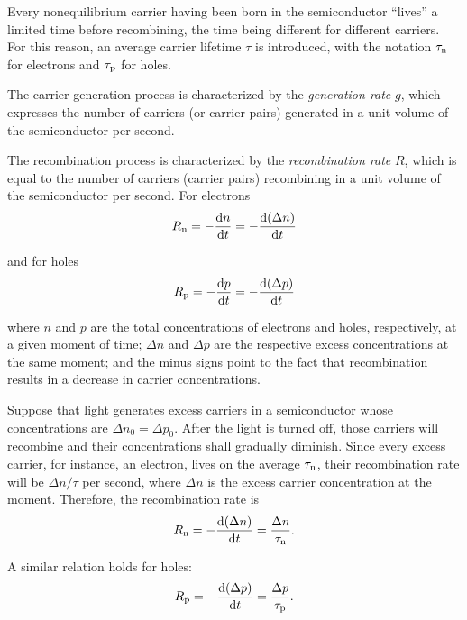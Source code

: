 Every nonequilibrium carrier having been born in the semiconductor ``lives'' a limited time before recombining, the time being different for different carriers. For this reason, an average carrier lifetime $\tau$ is introduced, with the notation $\tau_{\text{n}}$ for electrons and $\tau_{\text{p}}$ for holes.

The carrier generation process is characterized by the \textit{generation rate} $g$, which expresses the number of carriers (or carrier pairs) generated in a unit volume of the semiconductor per second.

The recombination process is characterized by the \textit{recombination rate} $R$, which is equal to the number of carriers (carrier pairs) recombining in a unit volume of the semiconductor per second. For electrons
\begin{equation}\label{eq:5_46}
    R_{\text{n}} = -\dfrac{\mathrm{d} n}{\mathrm{d} t} = - \dfrac{\mathrm{d}(\Delta{n})}{\mathrm{d} t}
\end{equation}

\noindent
and for holes
\begin{equation}\label{eq:5_47}
    R_{\text{p}} = -\dfrac{\mathrm{d} p}{\mathrm{d} t} = - \dfrac{\mathrm{d}(\Delta{p})}{\mathrm{d} t}
\end{equation}

\noindent
where $n$ and $p$ are the total concentrations of electrons and holes, respectively, at a given moment of time; $\Delta{n}$ and $\Delta{p}$ are the respective
excess concentrations at the same moment; and the minus signs point to the fact that recombination results in a decrease in carrier concentrations.

Suppose that light generates excess carriers in a semiconductor whose concentrations are $\Delta{n}_0=\Delta{p}_0$. After the light is turned off, those carriers will recombine and their concentrations shall gradually diminish. Since every excess carrier, for instance, an electron, lives on the average $\tau_{\text{n}}$, their recombination rate will be $\Delta{n}/\tau$ per second, where $\Delta{n}$ is the excess carrier concentration at the moment. Therefore, the recombination rate is
\begin{equation}\label{eq:5_48}
    R_{\text{n}} = - \dfrac{\mathrm{d}(\Delta{n})}{\mathrm{d} t} = \frac{\Delta{n}}{\tau_{\text{n}}}.
\end{equation}

\noindent
A similar relation holds for holes:
\begin{equation}\label{eq:5_49}
    R_{\text{p}} = - \dfrac{\mathrm{d}(\Delta{p})}{\mathrm{d} t} = \frac{\Delta{p}}{\tau_{\text{p}}}.
\end{equation}

